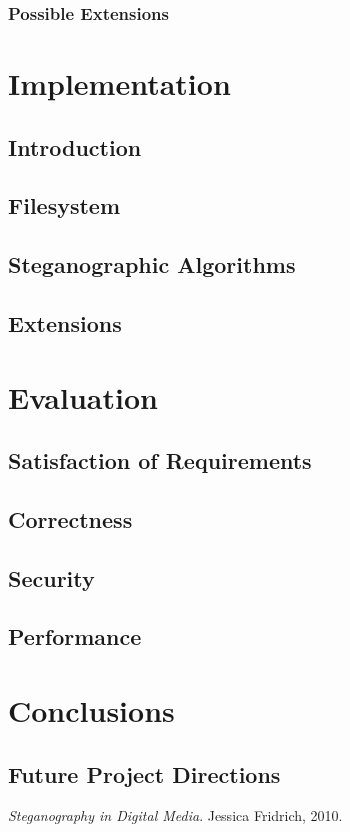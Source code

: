 \documentclass[paper=a4, fontsize=11pt,twoside]{scrartcl}    %
\begin{document}
\subsubsection{Possible Extensions}

\section{Implementation}
\subsection{Introduction}
\subsection{Filesystem}
\subsection{Steganographic Algorithms}
\subsection{Extensions}

\section{Evaluation}
\subsection{Satisfaction of Requirements}
\subsection{Correctness}
\subsection{Security}
\subsection{Performance}

\section{Conclusions}
\subsection{Future Project Directions}


\begin{thebibliography}{1}

  \emph{Steganography in Digital Media}.
  Jessica Fridrich, 2010.

\end{thebibliography}
\end{document}
